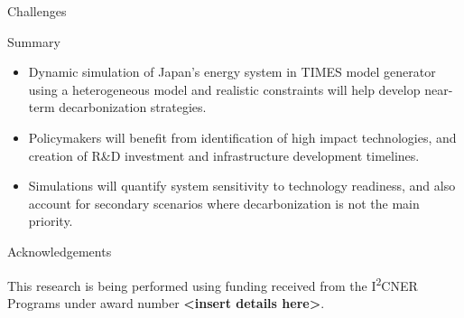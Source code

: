 \documentclass[final]{beamer}
\newlength{\onecolwid}
\newlength{\threecolwid}
\begin{document}
\begin{frame}[t]
\begin{columns}[t,totalwidth=\threecolwid]
\begin{column}{\onecolwid}
\begin{block}{Challenges}
\begin{itemize}
 
 \end{itemize}  
 
 	
\end{block}



\begin{block}{Summary}
\begin{itemize}

\item Dynamic simulation of Japan's energy system in TIMES model generator using a heterogeneous model and realistic constraints will help develop near-term decarbonization strategies.

\item Policymakers will benefit from identification of high impact technologies, and creation of R\&D investment and infrastructure development timelines.

\item Simulations will quantify system sensitivity to technology readiness, and also account for secondary scenarios where decarbonization is not the main priority.

\end{itemize}

\end{block}



\begin{block}{Acknowledgements}

This research is being performed using funding received
from the I\textsuperscript{2}CNER Programs under award number \textbf{<insert details here>}.


\end{block}
\end{column}
\end{columns}
\end{frame}
\end{document}
